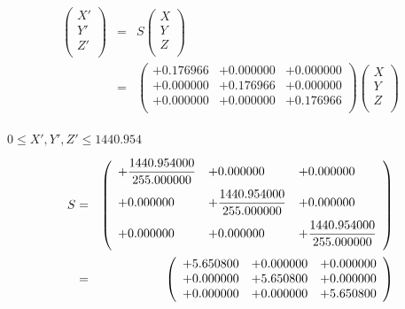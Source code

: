 \documentclass{article}
\begin{document}
\begin{eqnarray*} \left( \begin{array}{l} X' \\ Y' \\ Z' \\ \end{array} \right) &=& S \left( \begin{array}{l} X \\ Y \\ Z \\ \end{array} \right) \\ &=& \left( \begin{array}{lll} +0.176966 & +0.000000 & +0.000000 \\ +0.000000 & +0.176966 & +0.000000 \\ +0.000000 & +0.000000 & +0.176966 \\ \end{array} \right) \left( \begin{array}{l} X \\ Y \\ Z \\ \end{array} \right) \\ \end{eqnarray*}
\pagebreak

$ 0 \le X', Y', Z' \le 1440.954 $
\pagebreak

\begin{eqnarray*} S &=& \left( \begin{array}{lll} +\dfrac{1440.954000}{255.000000} & +0.000000 & +0.000000 \vspace{.5em} \\ +0.000000 & +\dfrac{1440.954000}{255.000000} & +0.000000 \vspace{.5em} \\ +0.000000 & +0.000000 & +\dfrac{1440.954000}{255.000000} \vspace{.5em} \\ \end{array} \right) \\ &=& \left( \begin{array}{lll} +5.650800 & +0.000000 & +0.000000 \\ +0.000000 & +5.650800 & +0.000000 \\ +0.000000 & +0.000000 & +5.650800 \\ \end{array} \right) \\ \end{eqnarray*}
\pagebreak
\end{document}

